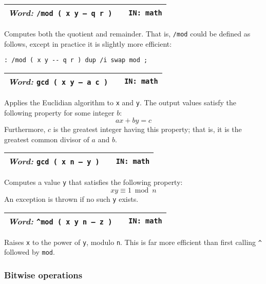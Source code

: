 \documentclass{report}
\newcommand{\ordinaryword}[3]{\index{#1}
\emph{Word:} \texttt{#2} &&\texttt{IN: #3}}
\newcommand{\wordtable}[1]{

\begin{tabularx}{12cm}[t]{lXr}
\hline
#1\\
\hline
\end{tabularx}

}
\begin{document}
\wordtable{
\ordinaryword{/mod}{/mod ( x y -- q r )}{math}
}
Computes both the quotient and remainder. That is, \texttt{/mod} could be defined as follows, except in practice it is slightly more efficient:
\begin{verbatim}
: /mod ( x y -- q r ) dup /i swap mod ;
\end{verbatim}
\wordtable{
\ordinaryword{gcd}{gcd ( x y -- a c )}{math}
}
Applies the Euclidian algorithm to \texttt{x} and \texttt{y}. The output values satisfy the following property for some integer $b$:
$$ax+by=c$$
Furthermore, $c$ is the greatest integer having this property; that is, it is the greatest common divisor of $a$ and $b$.
\wordtable{
\ordinaryword{mod-inv}{gcd ( x n -- y )}{math}
}
Computes a value \texttt{y} that satisfies the following property:
$$xy \equiv 1 \bmod{n}$$ An exception is thrown if no such \texttt{y} exists.
\wordtable{
\ordinaryword{\^{}mod}{\^{}mod ( x y n -- z )}{math}
}
Raises \texttt{x} to the power of \texttt{y}, modulo \texttt{n}. This is far more efficient than first calling \texttt{\^{}} followed by \texttt{mod}.

\subsubsection{\label{bitwise}Bitwise operations}
\end{document}
